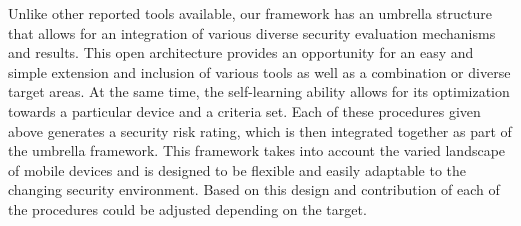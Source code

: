Unlike other reported tools available, our framework has an umbrella structure that allows for an integration of various diverse security evaluation mechanisms and results. This open architecture provides an opportunity for an easy and simple extension and inclusion of various tools as well as a combination or diverse target areas. At the same time, the self-learning ability allows for its optimization towards a particular device and a criteria set. Each of these procedures given above generates a security risk rating, which is then integrated together as part of the umbrella framework. This framework takes into account the varied landscape of mobile devices and is designed to be flexible and easily adaptable to the changing security environment. Based on this design and contribution of each of the procedures could be adjusted depending on the target.
